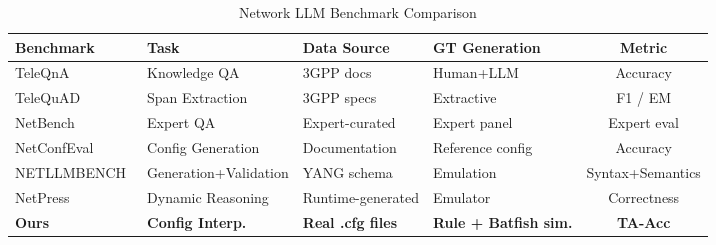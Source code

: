 \begin{table}[!t]
  \caption{Network LLM Benchmark Comparison}
  \label{tab:benchmark_comparison}
  \centering
  \small
  \begin{tabular}{llllc}
    \toprule
    \textbf{Benchmark}                     & \textbf{Task}          & \textbf{Data Source}     & \textbf{GT Generation}           & \textbf{Metric}  \\
    \midrule
    TeleQnA~\cite{ref9}                    & Knowledge QA           & 3GPP docs                & Human+LLM                        & Accuracy         \\
    TeleQuAD~\cite{ref10}                  & Span Extraction         & 3GPP specs               & Extractive                       & F1 / EM          \\
    NetBench~\cite{ref11}                  & Expert QA              & Expert-curated           & Expert panel                     & Expert eval      \\
    NetConfEval~\cite{wang2024netconfeval} & Config Generation      & Documentation            & Reference config                 & Accuracy         \\
    NETLLM\allowbreak BENCH~\cite{ref12}   & Generation+Validation  & YANG schema              & Emulation                        & Syntax+Semantics \\
    NetPress~\cite{ref7}                   & Dynamic Reasoning      & Runtime-generated        & Emulator                         & Correctness      \\
    \midrule
    \textbf{Ours}                          & \textbf{Config Interp.} & \textbf{Real .cfg files} & \textbf{Rule + Batfish sim.}     & \textbf{TA-Acc}  \\
    \bottomrule
  \end{tabular}
\end{table}